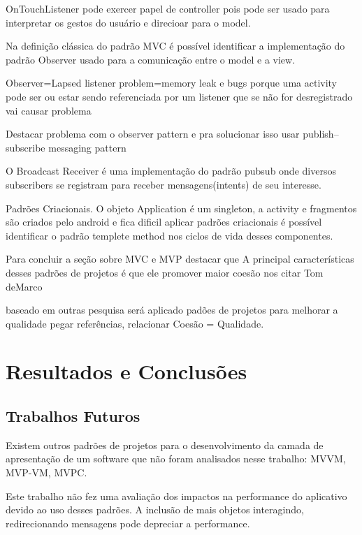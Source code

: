\documentclass[
	12pt,				%
	openright,			%
	twoside,			%
	a4paper,			%
	english,			%
	french,				%
	spanish,			%
	brazil,				%
	]{abntex2}
\begin{document}
OnTouchListener pode exercer papel de controller pois
pode ser usado para interpretar os gestos do usuário e direcioar para o model.


Na definição clássica do padrão MVC é possível identificar a implementação do
padrão Observer usado para a comunicação entre o model e a view.

Observer=Lapsed listener problem=memory leak e bugs porque uma activity pode ser
ou estar sendo referenciada por um listener que se não for desregistrado vai
causar problema

Destacar problema com o observer pattern e pra solucionar isso
usar publish–subscribe messaging pattern

O Broadcast Receiver é uma implementação do padrão pubsub onde diversos
subscribers se registram para receber mensagens(intents) de seu interesse.


Padrões Criacionais. O objeto Application é um singleton, a activity e
fragmentos são criados pelo android e fica dificil aplicar padrões criacionais é
possível identificar o padrão templete method nos ciclos de vida desses
componentes.



 Para concluir a seção sobre MVC e MVP destacar que A principal características
 desses padrões de projetos é que ele promover maior coesão nos citar Tom deMarco 

baseado em outras pesquisa será aplicado padões de projetos  para melhorar a
 qualidade pegar referências,  relacionar Coesão = Qualidade.

\chapter{Resultados e Conclusões}



\section{Trabalhos Futuros}

Existem outros padrões de projetos para o desenvolvimento da camada de
apresentação de um software que não foram analisados nesse trabalho: MVVM,
MVP-VM, MVPC.

Este trabalho não fez uma avaliação dos impactos na performance do aplicativo
devido ao uso desses padrões. A inclusão de mais objetos interagindo,
redirecionando mensagens pode depreciar a performance.
\end{document}
